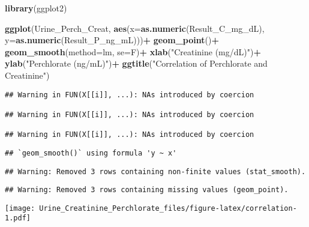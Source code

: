 \documentclass[]{article}
\newenvironment{Shaded}{\begin{snugshade}}{\end{snugshade}}
\newcommand{\DataTypeTok}[1]{\textcolor[rgb]{0.13,0.29,0.53}{#1}}
\newcommand{\KeywordTok}[1]{\textcolor[rgb]{0.13,0.29,0.53}{\textbf{#1}}}
\newcommand{\NormalTok}[1]{#1}
\newcommand{\OperatorTok}[1]{\textcolor[rgb]{0.81,0.36,0.00}{\textbf{#1}}}
\newcommand{\StringTok}[1]{\textcolor[rgb]{0.31,0.60,0.02}{#1}}
\begin{document}
\begin{Shaded}
\begin{Highlighting}[]
\KeywordTok{library}\NormalTok{(ggplot2)}

\KeywordTok{ggplot}\NormalTok{(Urine_Perch_Creat, }\KeywordTok{aes}\NormalTok{(}\DataTypeTok{x=}\KeywordTok{as.numeric}\NormalTok{(Result_C_mg_dL), }\DataTypeTok{y=}\KeywordTok{as.numeric}\NormalTok{(Result_P_ng_mL)))}\OperatorTok{+}
\StringTok{  }\KeywordTok{geom_point}\NormalTok{()}\OperatorTok{+}
\StringTok{  }\KeywordTok{geom_smooth}\NormalTok{(}\DataTypeTok{method=}\NormalTok{lm, }\DataTypeTok{se=}\NormalTok{F)}\OperatorTok{+}
\StringTok{  }\KeywordTok{xlab}\NormalTok{(}\StringTok{"Creatinine (mg/dL)"}\NormalTok{)}\OperatorTok{+}
\StringTok{  }\KeywordTok{ylab}\NormalTok{(}\StringTok{"Perchlorate (ng/mL)"}\NormalTok{)}\OperatorTok{+}
\StringTok{  }\KeywordTok{ggtitle}\NormalTok{(}\StringTok{"Correlation of Perchlorate and Creatinine"}\NormalTok{)}
\end{Highlighting}
\end{Shaded}

\begin{verbatim}
## Warning in FUN(X[[i]], ...): NAs introduced by coercion

## Warning in FUN(X[[i]], ...): NAs introduced by coercion

## Warning in FUN(X[[i]], ...): NAs introduced by coercion
\end{verbatim}

\begin{verbatim}
## `geom_smooth()` using formula 'y ~ x'
\end{verbatim}

\begin{verbatim}
## Warning: Removed 3 rows containing non-finite values (stat_smooth).
\end{verbatim}

\begin{verbatim}
## Warning: Removed 3 rows containing missing values (geom_point).
\end{verbatim}

\texttt{[image: Urine\_Creatinine\_Perchlorate\_files/figure-latex/correlation-1.pdf]}
\end{document}

